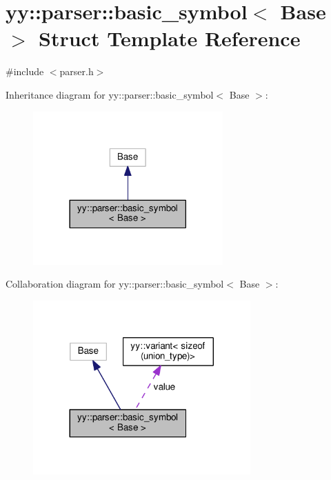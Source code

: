 \hypertarget{structyy_1_1parser_1_1basic__symbol}{}\section{yy\+:\+:parser\+:\+:basic\+\_\+symbol$<$ Base $>$ Struct Template Reference}
\label{structyy_1_1parser_1_1basic__symbol}


{\ttfamily \#include $<$parser.\+h$>$}



Inheritance diagram for yy\+:\+:parser\+:\+:basic\+\_\+symbol$<$ Base $>$\+:\nopagebreak
\begin{figure}[H]
\begin{center}
\leavevmode
\includegraphics[width=206pt]{structyy_1_1parser_1_1basic__symbol__inherit__graph}
\end{center}
\end{figure}


Collaboration diagram for yy\+:\+:parser\+:\+:basic\+\_\+symbol$<$ Base $>$\+:\nopagebreak
\begin{figure}[H]
\begin{center}
\leavevmode
\includegraphics[width=236pt]{structyy_1_1parser_1_1basic__symbol__coll__graph}
\end{center}
\end{figure}
